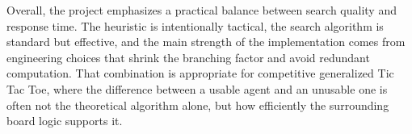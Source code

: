 \documentclass[10pt]{article}
\begin{document}
Overall, the project emphasizes a practical balance between search quality and response time. The heuristic is intentionally tactical, the search algorithm is standard but effective, and the main strength of the implementation comes from engineering choices that shrink the branching factor and avoid redundant computation. That combination is appropriate for competitive generalized Tic Tac Toe, where the difference between a usable agent and an unusable one is often not the theoretical algorithm alone, but how efficiently the surrounding board logic supports it.
\end{document}
